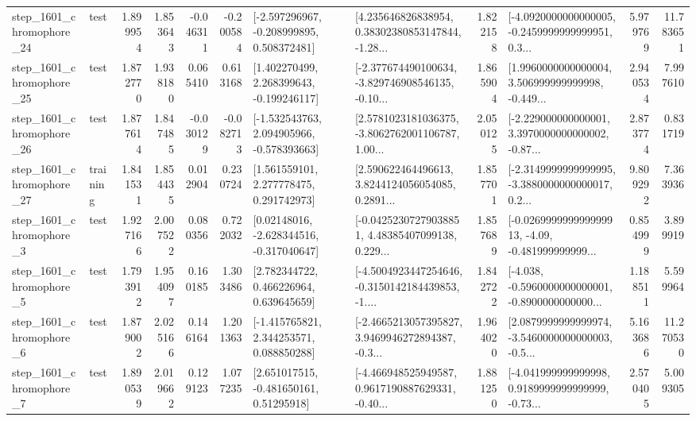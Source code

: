 \begin{tabular}{llrrrrllrlrr}
 step\_1601\_chromophore\_24 &      test &      1.899954 &    1.853643 &     -0.046311 & -0.200584 &   [-2.597296967, -0.208999895, 0.508372481] &  [4.235646826838954, 0.38302380853147844, -1.28... &       1.822158 &  [-4.0920000000000005, -0.2459999999999951, 0.3... &            5.979769 &         11.783651 \\
 step\_1601\_chromophore\_25 &      test &      1.872770 &    1.938180 &      0.065410 &  0.613168 &    [1.402270499, 2.268399643, -0.199246117] &  [-2.377674490100634, -3.829746908546135, -0.10... &       1.865904 &  [1.9960000000000004, 3.506999999999998, -0.449... &            2.940534 &          7.997610 \\
 step\_1601\_chromophore\_26 &      test &      1.877614 &    1.847485 &     -0.030129 & -0.082713 &   [-1.532543763, 2.094905966, -0.578393663] &  [2.5781023181036375, -3.8062762001106787, 1.00... &       2.050125 &  [-2.229000000000001, 3.3970000000000002, -0.87... &            2.873774 &          0.831719 \\
 step\_1601\_chromophore\_27 &  training &      1.841531 &    1.854435 &      0.012904 &  0.230724 &     [1.561559101, 2.277778475, 0.291742973] &  [2.590622464496613, 3.8244124056054085, 0.2891... &       1.857701 &  [-2.3149999999999995, -3.3880000000000017, 0.2... &            9.809292 &          7.363936 \\
  step\_1601\_chromophore\_3 &      test &      1.927166 &    2.007522 &      0.080356 &  0.722032 &    [0.02148016, -2.628344516, -0.317040647] &  [-0.04252307279038851, 4.48385407099138, 0.229... &       1.857689 &  [-0.026999999999999913, -4.09, -0.481999999999... &            0.854999 &          3.899919 \\
  step\_1601\_chromophore\_5 &      test &      1.793912 &    1.954097 &      0.160185 &  1.303486 &     [2.782344722, 0.466226964, 0.639645659] &  [-4.5004923447254646, -0.3150142184439853, -1.... &       1.842722 &  [-4.038, -0.5960000000000001, -0.8900000000000... &            1.188511 &          5.599964 \\
  step\_1601\_chromophore\_6 &      test &      1.879002 &    2.025166 &      0.146164 &  1.201363 &    [-1.415765821, 2.344253571, 0.088850288] &  [-2.4665213057395827, 3.9469946272894387, -0.3... &       1.964020 &  [2.0879999999999974, -3.5460000000000003, -0.5... &            5.163686 &         11.270530 \\
  step\_1601\_chromophore\_7 &      test &      1.890539 &    2.019662 &      0.129123 &  1.077235 &     [2.651017515, -0.481650161, 0.51295918] &  [-4.466948525949587, 0.9617190887629331, -0.40... &       1.881250 &  [-4.041999999999998, 0.9189999999999999, -0.73... &            2.570405 &          5.009305 \\

\end{tabular}

